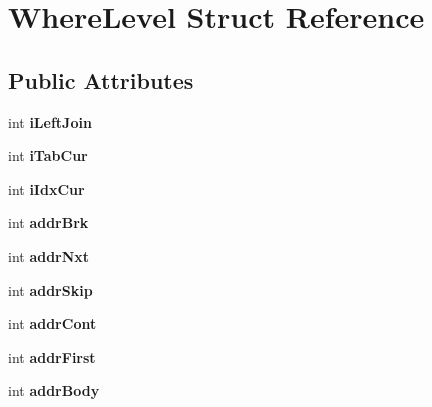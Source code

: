 \hypertarget{struct_where_level}{}\section{Where\+Level Struct Reference}
\label{struct_where_level}
\subsection*{Public Attributes}
\begin{DoxyCompactItemize}
\item 
\mbox{\label{struct_where_level_a600072864f71c568cabcbb6140f6955a}} 
int {\bfseries i\+Left\+Join}
\item 
\mbox{\label{struct_where_level_aa31c27c3304de936a6ce974450c55592}} 
int {\bfseries i\+Tab\+Cur}
\item 
\mbox{\label{struct_where_level_a0733f34c7987c721351ab0001d4b1dd9}} 
int {\bfseries i\+Idx\+Cur}
\item 
\mbox{\label{struct_where_level_a06f788bd4109f394d162250af9582e45}} 
int {\bfseries addr\+Brk}
\item 
\mbox{\label{struct_where_level_ab4b748f1fa2ec727f00ca42d9df60144}} 
int {\bfseries addr\+Nxt}
\item 
\mbox{\label{struct_where_level_ae7fa600bc2de02c08095ae310e69e594}} 
int {\bfseries addr\+Skip}
\item 
\mbox{\label{struct_where_level_a493d44d8f3b53d4d47191d751f8a9a94}} 
int {\bfseries addr\+Cont}
\item 
\mbox{\label{struct_where_level_a2d87c8fb787ca4111d7ab38a838325a8}} 
int {\bfseries addr\+First}
\item 
\mbox{\label{struct_where_level_aa5e7bf3c8aa96edc0e65b7e669bfd49b}} 
int {\bfseries addr\+Body}
\item 
\mbox{\label{struct_where_level_ae1e65eb45261ec73581714758d9b73ac}} 

\end{DoxyCompactItemize}

